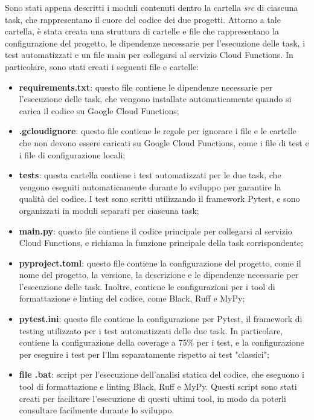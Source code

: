 Sono stati appena descritti i moduli contenuti dentro la cartella \emph{src} di ciascuna task, che rappresentano il cuore del codice dei due progetti. Attorno a tale cartella, è stata creata una struttura di cartelle e file che rappresentano la configurazione del progetto, le dipendenze necessarie per l'esecuzione delle task, i test automatizzati e un file main per collegarsi al servizio Cloud Functions. In particolare, sono stati creati i seguenti file e cartelle:
\begin{itemize}
    \item \textbf{requirements.txt}: questo file contiene le dipendenze necessarie per l'esecuzione delle task, che vengono installate automaticamente quando si carica il codice su Google Cloud Functions;
    \item \textbf{.gcloudignore}: questo file contiene le regole per ignorare i file e le cartelle che non devono essere caricati su Google Cloud Functions, come i file di test e i file di configurazione locali;
    \item \textbf{tests}: questa cartella contiene i test automatizzati per le due task, che vengono eseguiti automaticamente durante lo sviluppo per garantire la qualità del codice. I test sono scritti utilizzando il framework Pytest, e sono organizzati in moduli separati per ciascuna task;
    \item \textbf{main.py}: questo file contiene il codice principale per collegarsi al servizio Cloud Functions, e richiama la funzione principale della task corrispondente;
    \item \textbf{pyproject.toml}: questo file contiene la configurazione del progetto, come il nome del progetto, la versione, la descrizione e le dipendenze necessarie per l'esecuzione delle task. Inoltre, contiene le configurazioni per i tool di formattazione e linting del codice, come Black, Ruff e MyPy;
    \item \textbf{pytest.ini}: questo file contiene la configurazione per Pytest, il framework di testing utilizzato per i test automatizzati delle due task. In particolare, contiene la configurazione della coverage a 75\% per i test, e la configurazione per eseguire i test per l'\gls{llm} separatamente rispetto ai test "classici";
    \item \textbf{file .bat}: script per l'esecuzione dell'analisi statica del codice, che eseguono i tool di formattazione e linting Black, Ruff e MyPy. Questi script sono stati creati per facilitare l'esecuzione di questi ultimi tool, in modo da poterli consultare facilmente durante lo sviluppo.
\end{itemize}



